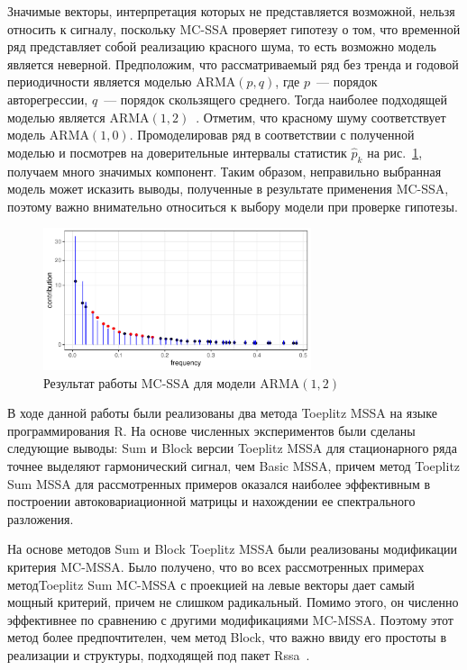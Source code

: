 \documentclass[specialist,
substylefile = spbu_report.rtx,
subf,href,colorlinks=true, 12pt]{disser}
\theoremstyle{definition}
\begin{document}
Значимые векторы, интерпретация которых не представляется возможной, нельзя относить к сигналу, поскольку MC-SSA проверяет гипотезу о том, что временной ряд представляет собой реализацию красного шума, то есть возможно модель является неверной. Предположим, что рассматриваемый ряд без тренда и годовой периодичности является моделью ARMA$(p, q)$, где $p$~--- порядок авторегрессии, $q$~--- порядок скользящего среднего. Тогда наиболее подходящей моделью является ARMA$(1, 2)$~\cite{auto.arima}. Отметим, что красному шуму соответствует модель ARMA$(1, 0)$. Промоделировав ряд в соответствии с полученной моделью и посмотрев на доверительные интервалы статистик $\hat p_k$ на рис.~\ref{Nino_mcssa_arma12}, получаем много значимых компонент. Таким образом, неправильно выбранная модель может исказить выводы, полученные в результате применения MC-SSA, поэтому важно внимательно относиться к выбору модели при проверке гипотезы.
\begin{figure}
	\centering
	\includegraphics[width=0.7\textwidth]{img/Nino_mcssa_arma12.pdf}
	\caption{Результат работы MC-SSA для модели ARMA$(1,2)$}
	\label{Nino_mcssa_arma12}
\end{figure}


\conclusion
В ходе данной работы были реализованы два метода Toeplitz MSSA на языке программирования \textsf{R}. На основе численных экспериментов были сделаны следующие выводы: Sum и Block версии Toeplitz MSSA для стационарного ряда точнее выделяют гармонический сигнал, чем Basic MSSA, причем метод Toeplitz Sum MSSA для рассмотренных примеров оказался наиболее эффективным в построении автоковариационной матрицы и нахождении ее спектрального разложения.

На основе методов Sum и Block Toeplitz MSSA были реализованы модификации критерия MC-MSSA. Было получено, что во всех рассмотренных примерах метод\linebreak Toeplitz Sum MC-MSSA с проекцией на левые векторы дает самый мощный критерий, причем не слишком радикальный. Помимо этого, он численно эффективнее по сравнению с другими модификациями MC-MSSA. Поэтому этот метод более предпочтителен, чем метод Block, что важно ввиду его простоты в реализации и структуры, подходящей под пакет \textsf{Rssa}~\cite{Rssa}.
\end{document}
